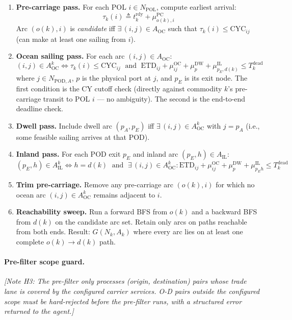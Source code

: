 \documentclass[11pt,a4paper]{article}
\newcommand{\defeq}{\triangleq}
\theoremstyle{definition}
\begin{document}
\begin{enumerate}
  \item \textbf{Pre-carriage pass.} For each POL $i \in N_{\text{POL}}$, compute earliest arrival:
    \[
      \tau_k(i) \defeq t_k^{\text{rdy}} + \mu_{o(k),i}^{\text{PC}}
    \]
    Arc $(o(k), i)$ is \emph{candidate} iff $\exists\, (i,j) \in A_{\text{OC}}$ such that
    $\tau_k(i) \leq \text{CYC}_{ij}$ (can make at least one sailing from $i$).

  \item \textbf{Ocean sailing pass.} For each arc $(i,j) \in A_{\text{OC}}$:
    \[
      (i,j) \in A^k_{\text{OC}} \iff
        \tau_k(i) \leq \text{CYC}_{ij}
        \;\text{ and }\;
        \text{ETD}_{ij} + \mu_{ij}^{\text{OC}} + \mu_p^{\text{DW}} + \mu_{p_E,d(k)}^{\text{IL}}
          \leq T_k^{\text{dead}}
    \]
    where $j \in N_{\text{POD},A}$, $p$ is the physical port at $j$, and $p_E$ is its exit node.
    The first condition is the CY cutoff check (directly against commodity $k$'s pre-carriage
    transit to POL $i$ — no ambiguity). The second is the end-to-end deadline check.

  \item \textbf{Dwell pass.} Include dwell arc $(p_A, p_E)$ iff $\exists\, (i,j) \in A^k_{\text{OC}}$
    with $j = p_A$ (i.e., some feasible sailing arrives at that POD).

  \item \textbf{Inland pass.} For each POD exit $p_E$ and inland arc $(p_E, h) \in A_{\text{IL}}$:
    \[
      (p_E, h) \in A^k_{\text{IL}} \iff h = d(k) \;\text{ and }\;
      \exists\, (i,j) \in A^k_{\text{OC}} : \text{ETD}_{ij} + \mu_{ij}^{\text{OC}}
        + \mu_p^{\text{DW}} + \mu_{p_E h}^{\text{IL}} \leq T_k^{\text{dead}}
    \]

  \item \textbf{Trim pre-carriage.} Remove any pre-carriage arc $(o(k), i)$ for which no
    ocean arc $(i,j) \in A^k_{\text{OC}}$ remains adjacent to $i$.

  \item \textbf{Reachability sweep.} Run a forward BFS from $o(k)$ and a backward BFS from
    $d(k)$ on the candidate arc set. Retain only arcs on paths reachable from both ends.
    Result: $G(N_k, A_k)$ where every arc lies on at least one complete $o(k) \to d(k)$ path.
\end{enumerate}

\paragraph{Pre-filter scope guard.}
\textit{[Note H3: The pre-filter only processes (origin, destination) pairs whose trade lane
is covered by the configured carrier services. O-D pairs outside the configured scope must be
hard-rejected before the pre-filter runs, with a structured error returned to the agent.]}
\end{document}
